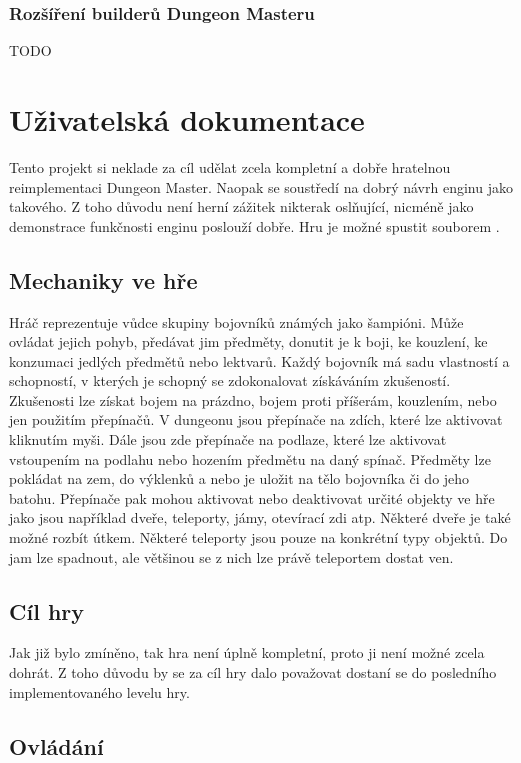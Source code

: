 \subsection{Rozšíření builderů Dungeon Masteru}
TODO

\chapter{Uživatelská dokumentace}
Tento projekt si neklade za cíl udělat zcela kompletní a dobře hratelnou reimplementaci Dungeon Master.
Naopak se soustředí na dobrý návrh enginu jako takového. Z toho důvodu není herní zážitek nikterak
oslňující, nicméně jako demonstrace funkčnosti enginu poslouží dobře. Hru je možné spustit souborem
.

\section{Mechaniky ve hře}
Hráč reprezentuje vůdce skupiny bojovníků známých jako šampióni. Může ovládat jejich pohyb, 
předávat jim předměty, donutit je k boji, ke kouzlení, ke konzumaci jedlých předmětů nebo lektvarů.
Každý bojovník má sadu vlastností a schopností, v kterých je schopný se zdokonalovat získáváním zkušeností.
Zkušenosti lze získat bojem na prázdno, bojem proti příšerám, kouzlením, nebo jen použitím přepínačů.
V dungeonu jsou přepínače na zdích, které lze aktivovat kliknutím myši. Dále jsou zde přepínače na 
podlaze, které lze aktivovat vstoupením na podlahu nebo hozením předmětu na daný spínač. Předměty lze
pokládat na zem, do výklenků a nebo je uložit na tělo bojovníka či do jeho batohu. Přepínače pak mohou 
aktivovat nebo deaktivovat určité objekty ve hře jako jsou například dveře, teleporty, jámy, otevírací
zdi atp. Některé dveře je také možné rozbít útkem. Některé teleporty jsou pouze na konkrétní typy objektů.
Do jam lze spadnout, ale většinou se z nich lze právě teleportem dostat ven.


\section{Cíl hry}
Jak již bylo zmíněno, tak hra není úplně kompletní, proto ji není možné zcela dohrát. Z toho důvodu by se za cíl 
hry dalo považovat dostaní se do posledního implementovaného levelu hry.

\section{Ovládání}

